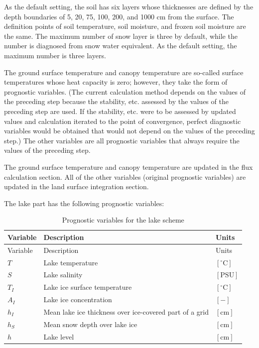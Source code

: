 As the default setting, the soil has six layers whose thicknesses are defined by the depth boundaries of 5, 20, 75, 100, 200, and 1000 cm from the surface. The definition points of soil temperature,
soil moisture, and frozen soil moisture are the same. The maximum number of snow layer is three by default, while the number is diagnosed from snow water equivalent. As the default setting, the
maximum number is three layers.

The ground surface temperature and canopy temperature are so-called surface temperatures whose heat capacity is zero; however, they take the form of prognostic variables. (The current calculation
method depends on the values of the preceding step because the stability, etc. assessed by the values of the preceding step are used. If the stability, etc. were to be assessed by updated values and
calculation iterated to the point of convergence, perfect diagnostic variables would be obtained that would not depend on the values of the preceding step.) The other variables are all prognostic
variables that always require the values of the preceding step.

The ground surface temperature and canopy temperature are updated in the flux calculation section. All of the other variables (original prognostic variables) are updated in the land surface
integration section.

The lake part has the following prognostic variables:

\begin{longtable}[]{@{}lll@{}}
\caption{Prognostic variables for the lake scheme}\tabularnewline
\toprule
Variable & Description & Units \\
\midrule
\endfirsthead
\toprule
Variable & Description & Units \\
\midrule
\endhead
\(T\) & Lake temperature & \(\mathrm{[^{\circ}C]}\) \\
\(S\) & Lake salinity & \(\mathrm{[PSU]}\) \\
\(T_I\) & Lake ice surface temperature & \(\mathrm{[^{\circ}C]}\) \\
\(A_I\) & Lake ice concentration & \(\mathrm{[-]}\) \\
\(h_I\) & Mean lake ice thickness over ice-covered part of a grid & \(\mathrm{[cm]}\) \\
\(h_S\) & Mean snow depth over lake ice & \(\mathrm{[cm]}\) \\
\(h\) & Lake level & \(\mathrm{[cm]}\) \\
\bottomrule
\end{longtable}


